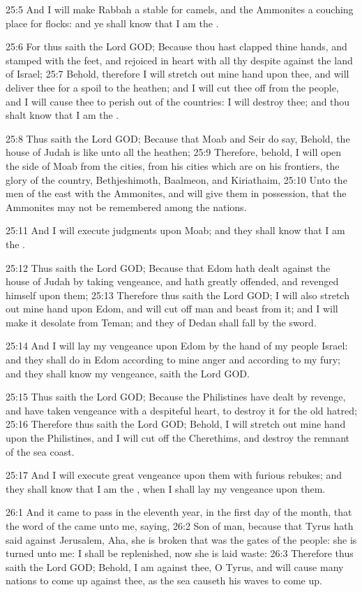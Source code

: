 25:5 And I will make Rabbah a stable for camels, and the Ammonites a couching place for flocks: and ye shall know that I am the \LORD.

25:6 For thus saith the Lord GOD; Because thou hast clapped thine hands, and stamped with the feet, and rejoiced in heart with all thy despite against the land of Israel; 25:7 Behold, therefore I will stretch out mine hand upon thee, and will deliver thee for a spoil to the heathen; and I will cut thee off from the people, and I will cause thee to perish out of the countries: I will destroy thee; and thou shalt know that I am the \LORD.

25:8 Thus saith the Lord GOD; Because that Moab and Seir do say, Behold, the house of Judah is like unto all the heathen; 25:9 Therefore, behold, I will open the side of Moab from the cities, from his cities which are on his frontiers, the glory of the country, Bethjeshimoth, Baalmeon, and Kiriathaim, 25:10 Unto the men of the east with the Ammonites, and will give them in possession, that the Ammonites may not be remembered among the nations.

25:11 And I will execute judgments upon Moab; and they shall know that I am the \LORD.

25:12 Thus saith the Lord GOD; Because that Edom hath dealt against the house of Judah by taking vengeance, and hath greatly offended, and revenged himself upon them; 25:13 Therefore thus saith the Lord GOD; I will also stretch out mine hand upon Edom, and will cut off man and beast from it; and I will make it desolate from Teman; and they of Dedan shall fall by the sword.

25:14 And I will lay my vengeance upon Edom by the hand of my people Israel: and they shall do in Edom according to mine anger and according to my fury; and they shall know my vengeance, saith the Lord GOD.

25:15 Thus saith the Lord GOD; Because the Philistines have dealt by revenge, and have taken vengeance with a despiteful heart, to destroy it for the old hatred; 25:16 Therefore thus saith the Lord GOD; Behold, I will stretch out mine hand upon the Philistines, and I will cut off the Cherethims, and destroy the remnant of the sea coast.

25:17 And I will execute great vengeance upon them with furious rebukes; and they shall know that I am the \LORD, when I shall lay my vengeance upon them.

26:1 And it came to pass in the eleventh year, in the first day of the month, that the word of the \LORD came unto me, saying, 26:2 Son of man, because that Tyrus hath said against Jerusalem, Aha, she is broken that was the gates of the people: she is turned unto me: I shall be replenished, now she is laid waste: 26:3 Therefore thus saith the Lord GOD; Behold, I am against thee, O Tyrus, and will cause many nations to come up against thee, as the sea causeth his waves to come up.

